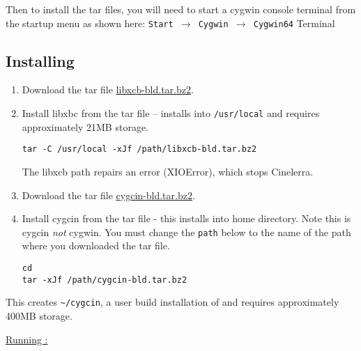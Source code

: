 Then to install the \CGG{} tar files, you will need to start a
cygwin console terminal from the startup menu as shown here:
\texttt{Start $\rightarrow$ Cygwin $\rightarrow$ Cygwin64}
Terminal

\subsection*{Installing \CGG{}}
\label{sec:installing_cinelerra}

\begin{enumerate}
\item Download the tar file
  \href{https://cinelerra-gg.org/download/testing/libxcb-bld.tar.bz2}{libxcb-bld.tar.bz2}.

\item Install libxbc from the tar file -- installs into
  \texttt{/usr/local} and requires approximately 21MB storage.
\begin{lstlisting}[style=sh]
tar -C /usr/local -xJf /path/libxcb-bld.tar.bz2
\end{lstlisting}
  The libxcb path repairs an error (XIOError), which stops
  Cinelerra.

\item Download the tar file
  \href{https://cinelerra-gg.org/download/testing/cygcin-bld.tar.bz2}{cygcin-bld.tar.bz2}.

\item Install cygcin from the tar file - this installs into home
  directory.  Note this is cygcin \emph{not} cygwin. You must change the
  \texttt{path} below to the name of the path where you downloaded
  the tar file.
\begin{lstlisting}[style=sh]
cd
tar -xJf /path/cygcin-bld.tar.bz2
\end{lstlisting}
\end{enumerate}

This creates \texttt{\~{}/cygcin}, a user build installation of
\CGG{} and requires approximately 400MB storage.

\underline{Running \CGG{}:}

